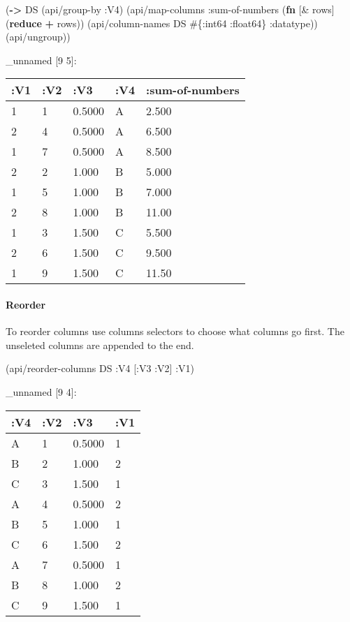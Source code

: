 \documentclass[]{article}
\newenvironment{Shaded}{\begin{snugshade}}{\end{snugshade}}
\newcommand{\KeywordTok}[1]{\textcolor[rgb]{0.13,0.29,0.53}{\textbf{#1}}}
\newcommand{\AttributeTok}[1]{\textcolor[rgb]{0.77,0.63,0.00}{#1}}
\newcommand{\NormalTok}[1]{#1}
\let\oldparagraph\paragraph
\renewcommand{\paragraph}[1]{\oldparagraph{#1}\mbox{}}
\begin{document}
\begin{Shaded}
\begin{Highlighting}[]
\NormalTok{(}\KeywordTok{->}\NormalTok{ DS}
\NormalTok{    (api/group-by }\AttributeTok{:V4}\NormalTok{)}
\NormalTok{    (api/map-columns }\AttributeTok{:sum-of-numbers}\NormalTok{ (}\KeywordTok{fn}\NormalTok{ [& rows]}
\NormalTok{                                       (}\KeywordTok{reduce} \KeywordTok{+}\NormalTok{ rows)) (api/column-names DS  #\{}\AttributeTok{:int64} \AttributeTok{:float64}\NormalTok{\} }\AttributeTok{:datatype}\NormalTok{))}
\NormalTok{    (api/ungroup))}
\end{Highlighting}
\end{Shaded}

\_unnamed {[}9 5{]}:

\begin{longtable}[]{@{}lllll@{}}
\toprule
:V1 & :V2 & :V3 & :V4 & :sum-of-numbers\tabularnewline
\midrule
\endhead
1 & 1 & 0.5000 & A & 2.500\tabularnewline
2 & 4 & 0.5000 & A & 6.500\tabularnewline
1 & 7 & 0.5000 & A & 8.500\tabularnewline
2 & 2 & 1.000 & B & 5.000\tabularnewline
1 & 5 & 1.000 & B & 7.000\tabularnewline
2 & 8 & 1.000 & B & 11.00\tabularnewline
1 & 3 & 1.500 & C & 5.500\tabularnewline
2 & 6 & 1.500 & C & 9.500\tabularnewline
1 & 9 & 1.500 & C & 11.50\tabularnewline
\bottomrule
\end{longtable}

\paragraph{Reorder}\label{reorder}

To reorder columns use columns selectors to choose what columns go
first. The unseleted columns are appended to the end.

\begin{Shaded}
\begin{Highlighting}[]
\NormalTok{(api/reorder-columns DS }\AttributeTok{:V4}\NormalTok{ [}\AttributeTok{:V3} \AttributeTok{:V2}\NormalTok{] }\AttributeTok{:V1}\NormalTok{)}
\end{Highlighting}
\end{Shaded}

\_unnamed {[}9 4{]}:

\begin{longtable}[]{@{}llll@{}}
\toprule
:V4 & :V2 & :V3 & :V1\tabularnewline
\midrule
\endhead
A & 1 & 0.5000 & 1\tabularnewline
B & 2 & 1.000 & 2\tabularnewline
C & 3 & 1.500 & 1\tabularnewline
A & 4 & 0.5000 & 2\tabularnewline
B & 5 & 1.000 & 1\tabularnewline
C & 6 & 1.500 & 2\tabularnewline
A & 7 & 0.5000 & 1\tabularnewline
B & 8 & 1.000 & 2\tabularnewline
C & 9 & 1.500 & 1\tabularnewline
\bottomrule
\end{longtable}
\end{document}
